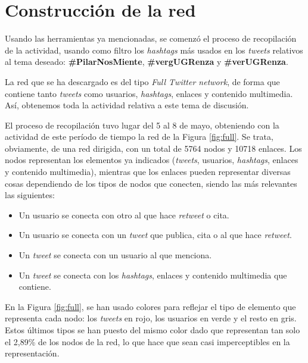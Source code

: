 \section{Construcción de la red}

Usando las herramientas ya mencionadas, se comenzó el proceso de recopilación de
la actividad, usando como filtro los \textit{hashtags} más usados en los
\textit{tweets} relativos al tema deseado: \textbf{\#PilarNosMiente},
\textbf{\#vergUGRenza} y \textbf{\#verUGRenza}.

La red que se ha descargado es del tipo \textit{Full Twitter network}, de forma
que contiene tanto \textit{tweets} como usuarios, \textit{hashtags}, enlaces y
contenido multimedia. Así, obtenemos toda la actividad relativa a este tema de
discusión.

El proceso de recopilación tuvo lugar del 5 al 8 de mayo, obteniendo con la
actividad de este período de tiempo la red de la Figura \ref{fig:full}. Se
trata, obviamente, de una red dirigida, con un total de 5764 nodos y 10718
enlaces. Los nodos representan los elementos ya indicados (\textit{tweets},
usuarios, \textit{hashtags}, enlaces y contenido multimedia), mientras que los
enlaces pueden representar diversas cosas dependiendo de los tipos de nodos que
conecten, siendo las más relevantes las siguientes:

\begin{itemize}
    \item Un usuario se conecta con otro al que hace \textit{retweet} o cita.
    \item Un usuario se conecta con un \textit{tweet} que publica, cita o al que
          hace \textit{retweet}.
    \item Un \textit{tweet} se conecta con un usuario al que menciona.
    \item Un \textit{tweet} se conecta con los \textit{hashtags}, enlaces y
          contenido multimedia que contiene.
\end{itemize}

En la Figura \ref{fig:full}, se han usado colores para reflejar el tipo de
elemento que representa cada nodo: los \textit{tweets} en rojo, los usuarios en
verde y el resto en gris. Estos últimos tipos se han puesto del mismo color dado
que representan tan solo el 2,89\% de los nodos de la red, lo que hace que sean
casi imperceptibles en la representación.

